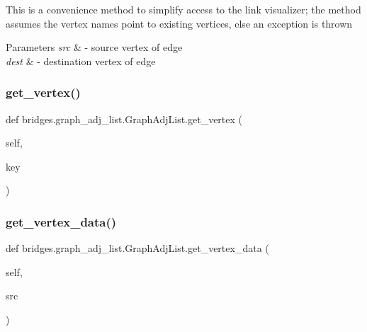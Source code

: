 \begin{DoxyVerb} This is a convenience method to simplify access to the link visualizer;
 the method assumes the vertex names point to existing vertices, else an exception
 is thrown
\end{DoxyVerb}



\begin{DoxyParams}{Parameters}
{\em src} & -\/ source vertex of edge \\
\hline
{\em dest} & -\/ destination vertex of edge \\
\hline
\end{DoxyParams}
\mbox{\label{classbridges_1_1graph__adj__list_1_1_graph_adj_list_af484d881d91177e723faf8b8a5c427e2}} 
\subsubsection{\texorpdfstring{get\_vertex()}{get\_vertex()}}
{\footnotesize\ttfamily def bridges.\+graph\+\_\+adj\+\_\+list.\+Graph\+Adj\+List.\+get\+\_\+vertex (\begin{DoxyParamCaption}\item[{}]{self,  }\item[{}]{key }\end{DoxyParamCaption})}

\mbox{\label{classbridges_1_1graph__adj__list_1_1_graph_adj_list_a0523e2e842042c131dcbe4fd66a6a296}} 
\subsubsection{\texorpdfstring{get\_vertex\_data()}{get\_vertex\_data()}}
{\footnotesize\ttfamily def bridges.\+graph\+\_\+adj\+\_\+list.\+Graph\+Adj\+List.\+get\+\_\+vertex\+\_\+data (\begin{DoxyParamCaption}\item[{}]{self,  }\item[{}]{src }\end{DoxyParamCaption})}

